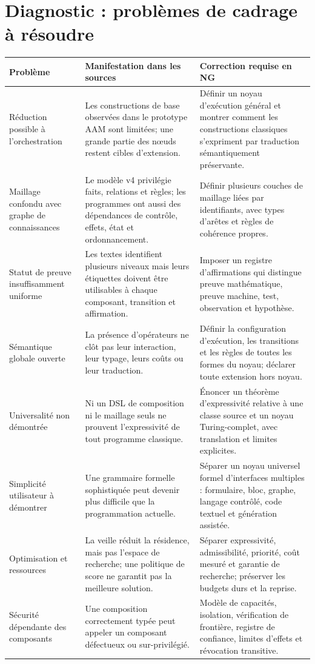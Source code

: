 \documentclass[11pt,a4paper]{article}
\begin{document}
\section{Diagnostic : problèmes de cadrage à résoudre}
\begin{longtable}{p{}p{}p{}}
\toprule
\textbf{Problème} & \textbf{Manifestation dans les sources} & \textbf{Correction requise en NG}\\
\midrule
Réduction possible à l'orchestration & Les constructions de base observées dans le prototype AAM sont limitées; une grande partie des nœuds restent cibles d'extension. & Définir un noyau d'exécution général et montrer comment les constructions classiques s'expriment par traduction sémantiquement préservante.\\
Maillage confondu avec graphe de connaissances & Le modèle v4 privilégie faits, relations et règles; les programmes ont aussi des dépendances de contrôle, effets, état et ordonnancement. & Définir plusieurs couches de maillage liées par identifiants, avec types d'arêtes et règles de cohérence propres.\\
Statut de preuve insuffisamment uniforme & Les textes identifient plusieurs niveaux mais leurs étiquettes doivent être utilisables à chaque composant, transition et affirmation. & Imposer un registre d'affirmations qui distingue preuve mathématique, preuve machine, test, observation et hypothèse.\\
Sémantique globale ouverte & La présence d'opérateurs ne clôt pas leur interaction, leur typage, leurs coûts ou leur traduction. & Définir la configuration d'exécution, les transitions et les règles de toutes les formes du noyau; déclarer toute extension hors noyau.\\
Universalité non démontrée & Ni un DSL de composition ni le maillage seuls ne prouvent l'expressivité de tout programme classique. & Énoncer un théorème d'expressivité relative à une classe source et un noyau Turing-complet, avec translation et limites explicites.\\
Simplicité utilisateur à démontrer & Une grammaire formelle sophistiquée peut devenir plus difficile que la programmation actuelle. & Séparer un noyau universel formel d'interfaces multiples : formulaire, bloc, graphe, langage contrôlé, code textuel et génération assistée.\\
Optimisation et ressources & La veille réduit la résidence, mais pas l'espace de recherche; une politique de score ne garantit pas la meilleure solution. & Séparer expressivité, admissibilité, priorité, coût mesuré et garantie de recherche; préserver les budgets durs et la reprise.\\
Sécurité dépendante des composants & Une composition correctement typée peut appeler un composant défectueux ou sur-privilégié. & Modèle de capacités, isolation, vérification de frontière, registre de confiance, limites d'effets et révocation transitive.\\
\bottomrule
\end{longtable}
\end{document}

